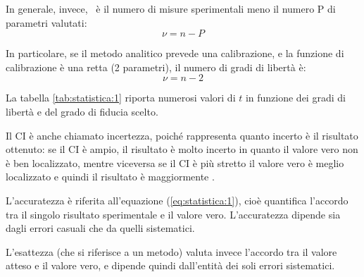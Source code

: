 In generale, invece, \nu\ è il numero di misure sperimentali meno il numero P di parametri valutati:
\begin{equation} \label{eq:statistica:11}
\nu = n - P
\end{equation}

In particolare, se il metodo analitico prevede una calibrazione, e la funzione di calibrazione è una retta (2 parametri), il numero di gradi di libertà è:
\begin{equation} \label{eq:statistica:12}
\nu = n - 2
\end{equation}

La tabella \ref{tab:statistica:1} riporta numerosi valori di $t$ in funzione dei gradi di libertà e del grado di fiducia scelto.

Il CI è anche chiamato incertezza, poiché rappresenta quanto incerto è il risultato ottenuto: se il CI è ampio, il risultato è molto incerto in quanto il valore vero non è ben localizzato, mentre viceversa se il CI è più stretto il valore vero è meglio localizzato e quindi il risultato è maggiormente .

L'accuratezza è riferita all'equazione (\ref{eq:statistica:1}), cioè quantifica l'accordo tra il singolo risultato sperimentale e il valore vero. L'accuratezza dipende sia dagli errori casuali che da quelli sistematici.

L'esattezza (che si riferisce a un metodo) valuta invece l'accordo tra il valore atteso e il valore vero, e dipende quindi dall'entità dei soli errori sistematici.


